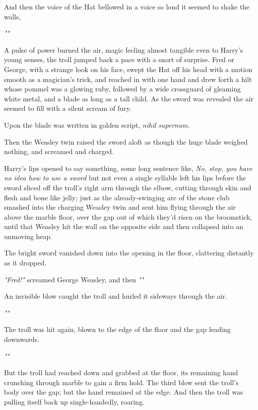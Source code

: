 And then the voice of the Hat bellowed in a voice so loud it seemed to shake
the walls,

\emph{""}

A pulse of power burned the air, magic feeling almost tangible even to Harry's
young senses, the troll jumped back a pace with a snort of surprise. Fred or
George, with a strange look on his face, swept the Hat off his head with a
motion smooth as a magician's trick, and reached in with one hand and drew
forth a hilt whose pommel was a glowing ruby, followed by a wide crossguard of
gleaming white metal, and a blade as long as a tall child. As the sword was
revealed the air seemed to fill with a silent scream of fury.

Upon the blade was written in golden script, \emph{nihil supernum.}

Then the Weasley twin raised the sword aloft as though the huge blade weighed
nothing, and screamed and charged.

Harry's lips opened to say something, some long sentence like, \emph{No, stop,
you have no idea how to use a sword} but not even a single syllable left his
lips before the sword sliced off the troll's right arm through the elbow,
cutting through skin and flesh and bone like jelly; just as the
already-swinging arc of the stone club smashed into the charging Weasley twin
and sent him flying through the air above the marble floor, over the gap out of
which they'd risen on the broomstick, until that Weasley hit the wall on the
opposite side and then collapsed into an unmoving heap.

The bright sword vanished down into the opening in the floor, clattering
distantly as it dropped.

\emph{"Fred!"} screamed George Weasley, and then \emph{""}

An invisible blow caught the troll and hurled it sideways through the air.

\emph{""}

The troll was hit again, blown to the edge of the floor and the gap leading
downwards.

\emph{""}

But the troll had reached down and grabbed at the floor, its remaining hand
crunching through marble to gain a firm hold. The third blow sent the troll's
body over the gap; but the hand remained at the edge. And then the troll was
pulling itself back up single-handedly, roaring.

